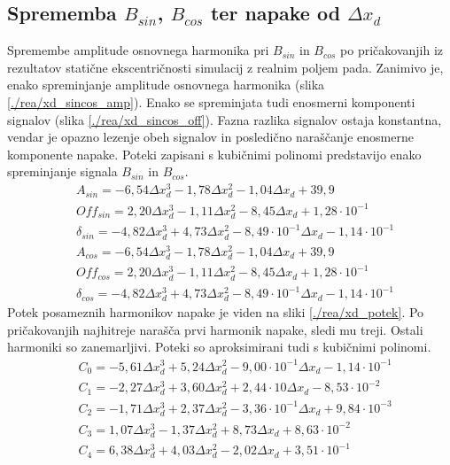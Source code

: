 \subsection{Sprememba $B_{sin}$, $B_{cos}$ ter napake od $\Delta x_d$}
Spremembe amplitude osnovnega harmonika pri $B_{sin}$ in $B_{cos}$ po pričakovanjih iz rezultatov statične ekscentričnosti simulacij z realnim poljem pada. Zanimivo je, enako spreminjanje amplitude osnovnega harmonika (slika \ref{./rea/xd_sincos_amp}). Enako se spreminjata tudi enosmerni komponenti signalov (slika \ref{./rea/xd_sincos_off}). Fazna razlika signalov ostaja konstantna, vendar je opazno lezenje obeh signalov in posledično naraščanje enosmerne komponente napake.
Poteki zapisani s kubičnimi polinomi predstavijo enako spreminjanje signala $B_{sin}$ in $B_{cos}$.
\begin{eqnarray}
&A_{sin} = -6,54\Delta x_d^3-1,78\Delta x_d^2-1,04\Delta x_d+39,9\\     
&Off_{sin} = 2,20\Delta x_d^3-1,11\Delta x_d^2-8,45\Delta x_d+1,28\cdot 10^{-1}\\   
&\delta_{sin} = -4,82\Delta x_d^3+4,73\Delta x_d^2-8,49\cdot 10^{-1}\Delta x_d-1,14\cdot 10^{-1}\\
&A_{cos} = -6,54\Delta x_d^3-1,78\Delta x_d^2-1,04\Delta x_d+39,9\\     
&Off_{cos} = 2,20\Delta x_d^3-1,11\Delta x_d^2-8,45\Delta x_d+1,28\cdot 10^{-1}\\   
&\delta_{cos} = -4,82\Delta x_d^3+4,73\Delta x_d^2-8,49\cdot 10^{-1}\Delta x_d-1,14\cdot 10^{-1}
\end{eqnarray}
Potek posameznih harmonikov napake je viden na sliki \ref{./rea/xd_potek}. Po pričakovanjih najhitreje narašča prvi harmonik napake, sledi mu treji. Ostali harmoniki so zanemarljivi. Poteki so aproksimirani tudi s kubičnimi polinomi.
\begin{eqnarray}
&C_0 =-5,61\Delta x_d^{3}+5,24\Delta x_d^{2}-9,00\cdot 10^{-1}\Delta x_d-1,14\cdot 10^{-1} \\
&C_1 =-2,27\Delta x_d^{3}+3,60\Delta x_d^{2}+2,44\cdot 10\Delta x_d-8,53\cdot 10^{-2} \\     
&C_2 =-1,71\Delta x_d^{3}+2,37\Delta x_d^{2}-3,36\cdot 10^{-1}\Delta x_d+9,84\cdot 10^{-3} \\
&C_3 =1,07\Delta x_d^{3}-1,37\Delta x_d^{2}+8,73\Delta x_d+8,63\cdot 10^{-2} \\              
&C_4 =6,38\Delta x_d^{3}+4,03\Delta x_d^{2}-2,02\Delta x_d+3,51\cdot 10^{-1}       
\end{eqnarray}

